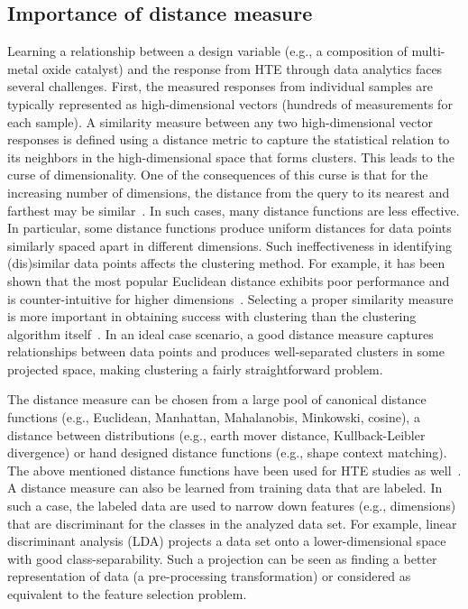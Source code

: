 \subsection{Importance of distance measure}
Learning a relationship between a design variable (e.g., a composition of multi-metal oxide catalyst) and the response from HTE through data analytics faces several challenges. 
First, the measured responses from individual samples are typically represented as high-dimensional vectors (hundreds of measurements for each sample). A similarity measure between any two high-dimensional vector responses is defined using a distance metric to capture the statistical relation to its neighbors in the high-dimensional space that forms clusters.
This leads to the curse of dimensionality.
One of the consequences of this curse is that for the increasing number of dimensions, the distance from the query to its nearest and farthest may be similar~\cite{bellman1961curse}. 
In such cases, many distance functions are less effective. 
In particular, some distance functions produce uniform distances for data points similarly spaced apart in different dimensions.
Such ineffectiveness in identifying (dis)similar data points affects the clustering method. 
For example, it has been shown that the most popular Euclidean distance exhibits poor performance and is counter-intuitive for higher dimensions~\cite{aggarwal2001surprising}.
Selecting a proper similarity measure is more important in obtaining success with clustering than the clustering algorithm itself~\cite{friedman2001elements}. 
In an ideal case scenario, a good distance measure captures relationships between data points and produces well-separated clusters in some projected space, making clustering a fairly straightforward problem. 

The distance measure can be chosen from a large pool of canonical distance functions (e.g., Euclidean, Manhattan, Mahalanobis,  Minkowski, cosine), a distance between distributions (e.g., earth mover distance, Kullback-Leibler divergence) or hand designed distance functions (e.g., shape context matching). 
The above mentioned distance functions have been used for HTE studies as well~\cite{iwasaki2017comparison,hattrick2016perspective,hernandez2016using}.
A distance measure can also be learned from training data that are labeled. 
In such a case, the labeled data are used to narrow down features (e.g., dimensions) that are discriminant for the classes in the analyzed data set. 
For example, linear discriminant analysis (LDA) projects a data set onto a lower-dimensional space with good class-separability. 
Such a projection can be seen as finding a better representation of data (a pre-processing transformation) or considered as equivalent to the feature selection problem.

